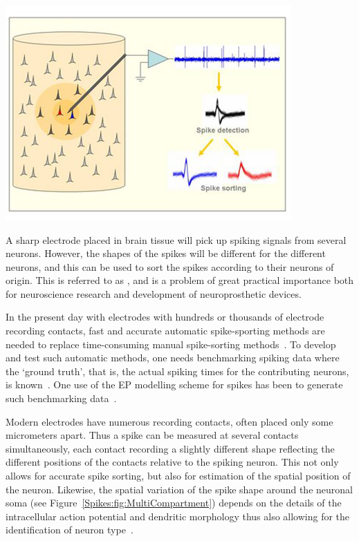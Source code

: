 \subsubsection{}
%
\centerline{\includegraphics{Figures/Spikes/Spikes-sorting-w35-r300}}\vspace*{6pt}
%
A sharp electrode placed in brain tissue will pick up spiking signals from several neurons. 
However, the shapes of the spikes will be different for the different neurons, and this can be used to sort the spikes according to their neurons of origin. This is referred to as , 
and is a problem of great practical importance both for neuroscience research and development of neuroprosthetic devices. 

In the present day with electrodes with hundreds or thousands of electrode recording contacts, fast and accurate automatic spike-sporting methods are needed to replace time-consuming manual spike-sorting methods~\citep{Quiroga2007}. To develop and test such automatic methods, one needs
benchmarking spiking data where the `ground truth', that is, the actual spiking times for the contributing neurons, is known~\citep{Einevoll2012}.
One use of the EP modelling scheme for spikes has been to generate such benchmarking data~\citep{CamunasMesa2013,Hagen2015,MondragonGonzalez2017}. 

Modern electrodes have numerous recording contacts, often placed only some micrometers apart. Thus a spike can be measured at several contacts
simultaneously, each contact recording a slightly different shape reflecting the different positions of the contacts relative to the spiking neuron. 
This not only allows for accurate spike sorting, but also for estimation of the spatial position of the neuron. Likewise, the spatial variation of the 
spike shape around the neuronal soma (see Figure~\ref{Spikes:fig:MultiCompartment}) 
depends on the details of the intracellular action potential and dendritic morphology thus also allowing for the 
identification of neuron type~\citep{Buccino2018}.    


